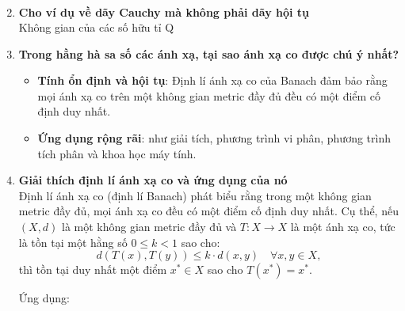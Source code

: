 \begin{enumerate}
\begin{align*}
    \end{align*}
    \item \textbf{Cho ví dụ về dãy Cauchy mà không phải dãy hội tụ}\\
    Không gian của các số hữu tỉ Q
    \item \textbf{Trong hằng hà sa số các ánh xạ, tại sao ánh xạ co được chú ý nhất?}
    \begin{itemize}
        \item \textbf{Tính ổn định và hội tụ}: Định lí ánh xạ co của Banach đảm bảo rằng mọi ánh xạ co trên một không gian metric đầy đủ đều có một điểm cố định duy nhất.        
        \item \textbf{Ứng dụng rộng rãi}: như giải tích, phương trình vi phân, phương trình tích phân và khoa học máy tính.        
    \end{itemize}
    \item \textbf{Giải thích định lí ánh xạ co và ứng dụng của nó}\\
    Định lí ánh xạ co (định lí Banach) phát biểu rằng trong một không gian metric đầy đủ, mọi ánh xạ co đều có một điểm cố định duy nhất. Cụ thể, nếu $(X, d)$ là một không gian metric đầy đủ và $T: X \to X$ là một ánh xạ co, tức là tồn tại một hằng số $0 \leq k < 1$ sao cho:
    \[
    d(T(x), T(y)) \leq k \cdot d(x, y) \quad \forall x, y \in X,
    \]
    thì tồn tại duy nhất một điểm $x^* \in X$ sao cho $T(x^*) = x^*$.
    
    Ứng dụng:
    

\end{enumerate}
